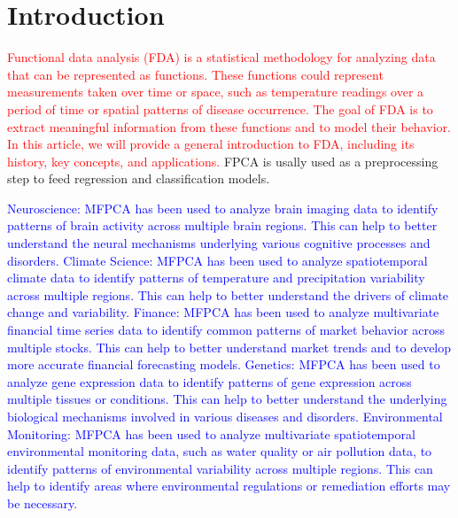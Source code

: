 \section{Introduction} %
\label{sec:introduction}

\textcolor{red}{Functional data analysis (FDA) is a statistical methodology for analyzing data that can be represented as functions. These functions could represent measurements taken over time or space, such as temperature readings over a period of time or spatial patterns of disease occurrence. The goal of FDA is to extract meaningful information from these functions and to model their behavior. In this article, we will provide a general introduction to FDA, including its history, key concepts, and applications.}
FPCA is usally used as a preprocessing step to feed regression and classification models.

\textcolor{blue}{Neuroscience: MFPCA has been used to analyze brain imaging data to identify patterns of brain activity across multiple brain regions. This can help to better understand the neural mechanisms underlying various cognitive processes and disorders.
Climate Science: MFPCA has been used to analyze spatiotemporal climate data to identify patterns of temperature and precipitation variability across multiple regions. This can help to better understand the drivers of climate change and variability.
Finance: MFPCA has been used to analyze multivariate financial time series data to identify common patterns of market behavior across multiple stocks. This can help to better understand market trends and to develop more accurate financial forecasting models.
Genetics: MFPCA has been used to analyze gene expression data to identify patterns of gene expression across multiple tissues or conditions. This can help to better understand the underlying biological mechanisms involved in various diseases and disorders.
Environmental Monitoring: MFPCA has been used to analyze multivariate spatiotemporal environmental monitoring data, such as water quality or air pollution data, to identify patterns of environmental variability across multiple regions. This can help to identify areas where environmental regulations or remediation efforts may be necessary.}

